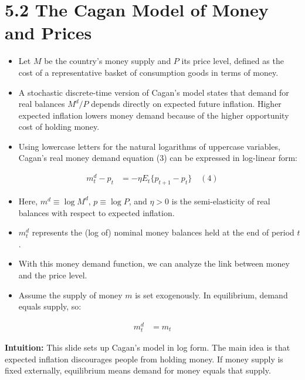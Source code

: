 \documentclass[12pt]{article}
\begin{document}
\section*{\noindent\textbf{5.2 The Cagan Model of Money and Prices}}

\begin{itemize}
    \item Let $M$ be the country’s money supply and $P$ its price level, defined as the cost of a representative basket of consumption goods in terms of money.  
    \item A stochastic discrete-time version of Cagan’s model states that demand for real balances $M^d / P$ depends directly on expected future inflation. Higher expected inflation lowers money demand because of the higher opportunity cost of holding money.  
    \item Using lowercase letters for the natural logarithms of uppercase variables, Cagan’s real money demand equation (3) can be expressed in log-linear form:  
\end{itemize}

\singlespacing
\begin{align}
m_t^d - p_t &= -\eta E_t\{p_{t+1} - p_t\} \quad (4)
\end{align}

\begin{itemize}
    \item Here, $m^d \equiv \log M^d$, $p \equiv \log P$, and $\eta > 0$ is the semi-elasticity of real balances with respect to expected inflation.  
    \item $m_t^d$ represents the (log of) nominal money balances held at the end of period $t$.  
    \item With this money demand function, we can analyze the link between money and the price level.  
    \item Assume the supply of money $m$ is set exogenously. In equilibrium, demand equals supply, so:  
\end{itemize}

\singlespacing
\begin{align}
m_t^d &= m_t
\end{align}

\textbf{Intuition:} This slide sets up Cagan’s model in log form. The main idea is that expected inflation discourages people from holding money. If money supply is fixed externally, equilibrium means demand for money equals that supply.
\end{document}
